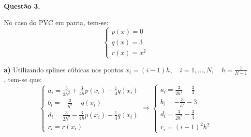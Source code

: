\documentclass{article}
\begin{document}
    \textbf{Questão 3.}

    No caso do PVC em pauta, tem-se:
    $$\begin{cases}
        p(x) = 0\\
        q(x) = 3\\
        r(x) = x^2
    \end{cases}$$

    \textbf{a)} Utilizando splines cúbicas nos pontos $x_i = (i-1)h, \quad i = 1,\dots,N, \quad h = \frac{1}{N-1}$, tem-se que:
    $$\begin{cases}
        a_i = \frac{3}{2h^2} + \frac{3}{4h}p(x_i) - \frac{1}{4}q(x_i)\\
        b_i = -\frac{3}{h^2} - q(x_i)\\
        d_i = \frac{3}{2h^2} - \frac{3}{4h}p(x_i) - \frac{1}{4}q(x_i)\\
        r_i = r(x_i)
    \end{cases} \Rightarrow \begin{cases}
        a_i = \frac{3}{2h^2} - \frac{3}{4}\\
        b_i = -\frac{3}{h^2} - 3\\
        d_i = \frac{3}{2h^2} - \frac{3}{4}\\
        r_i = (i - 1)^2h^2
    \end{cases}$$
\end{document}
